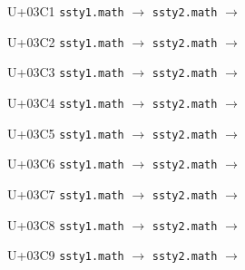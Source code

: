 \documentclass{article}
\begin{document}
\begin{substitutions}
\goodbreak

U+03C1  \linebreak
    \texttt{ssty1.math} $\to$  \linebreak
    \texttt{ssty2.math} $\to$  

\goodbreak

U+03C2  \linebreak
    \texttt{ssty1.math} $\to$  \linebreak
    \texttt{ssty2.math} $\to$  

\goodbreak

U+03C3  \linebreak
    \texttt{ssty1.math} $\to$  \linebreak
    \texttt{ssty2.math} $\to$  

\goodbreak

U+03C4  \linebreak
    \texttt{ssty1.math} $\to$  \linebreak
    \texttt{ssty2.math} $\to$  

\goodbreak

U+03C5  \linebreak
    \texttt{ssty1.math} $\to$  \linebreak
    \texttt{ssty2.math} $\to$  

\goodbreak

U+03C6  \linebreak
    \texttt{ssty1.math} $\to$  \linebreak
    \texttt{ssty2.math} $\to$  

\goodbreak

U+03C7  \linebreak
    \texttt{ssty1.math} $\to$  \linebreak
    \texttt{ssty2.math} $\to$  

\goodbreak

U+03C8  \linebreak
    \texttt{ssty1.math} $\to$  \linebreak
    \texttt{ssty2.math} $\to$  

\goodbreak

U+03C9  \linebreak
    \texttt{ssty1.math} $\to$  \linebreak
    \texttt{ssty2.math} $\to$  


\end{substitutions}
\end{document}
